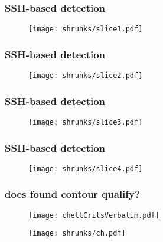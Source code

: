 \begin{frame}
\frametitle{SSH-based detection}
\begin{figure}
	\centering
	\texttt{[image: shrunks/slice1.pdf]}
\end{figure}
\end{frame}

\begin{frame}[noframenumbering]
\frametitle{SSH-based detection}
\begin{figure}
	\centering
	\texttt{[image: shrunks/slice2.pdf]}
\end{figure}
\end{frame}

\begin{frame}[noframenumbering]
\frametitle{SSH-based detection}
\begin{figure}
	\centering
	\texttt{[image: shrunks/slice3.pdf]}
\end{figure}
\end{frame}

\begin{frame}[noframenumbering]
\frametitle{SSH-based detection}
\begin{figure}
	\centering
	\texttt{[image: shrunks/slice4.pdf]}
\end{figure}
\end{frame}


\begin{frame}
 \frametitle{does found contour qualify?}
\begin{figure}
	\begin{centering}
	\texttt{[image: cheltCritsVerbatim.pdf]}%
	\end{centering}
\texttt{[image: shrunks/ch.pdf]}
\end{figure}
\end{frame}

